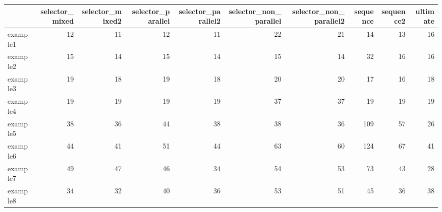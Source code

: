 \begin{tabular}{lrrrrrrrrr}
\toprule
{} &  selector\_mixed &  selector\_mixed2 &  selector\_parallel &  selector\_parallel2 &  selector\_non\_parallel &  selector\_non\_parallel2 &  sequence &  sequence2 &  ultimate \\
\midrule
example1 &              12 &               11 &                 12 &                  11 &                     22 &                      21 &        14 &         13 &        16 \\
example2 &              15 &               14 &                 15 &                  14 &                     15 &                      14 &        32 &         16 &        16 \\
example3 &              19 &               18 &                 19 &                  18 &                     20 &                      20 &        17 &         16 &        18 \\
example4 &              19 &               19 &                 19 &                  19 &                     37 &                      37 &        19 &         19 &        19 \\
example5 &              38 &               36 &                 44 &                  38 &                     38 &                      36 &       109 &         57 &        26 \\
example6 &              44 &               41 &                 51 &                  44 &                     63 &                      60 &       124 &         67 &        41 \\
example7 &              49 &               47 &                 46 &                  34 &                     54 &                      53 &        73 &         43 &        28 \\
example8 &              34 &               32 &                 40 &                  36 &                     53 &                      51 &        45 &         36 &        38 \\
\bottomrule
\end{tabular}
